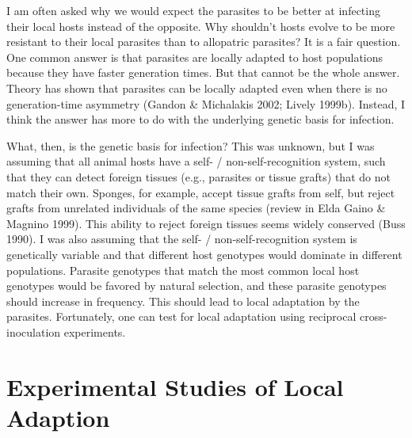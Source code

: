 \documentclass[
  letterpaper,
]{book}
\begin{document}
I am often asked why we would expect the parasites to be better at
infecting their local hosts instead of the opposite. Why shouldn't hosts
evolve to be more resistant to their local parasites than to allopatric
parasites? It is a fair question. One common answer is that parasites
are locally adapted to host populations because they have faster
generation times. But that cannot be the whole answer. Theory has shown
that parasites can be locally adapted even when there is no
generation-time asymmetry (Gandon \& Michalakis 2002; Lively 1999b).
Instead, I think the answer has more to do with the underlying genetic
basis for infection.

What, then, is the genetic basis for infection? This was unknown, but I
was assuming that all animal hosts have a self- / non-self-recognition
system, such that they can detect foreign tissues (e.g., parasites or
tissue grafts) that do not match their own. Sponges, for example, accept
tissue grafts from self, but reject grafts from unrelated individuals of
the same species (review in Elda Gaino \& Magnino 1999). This ability to
reject foreign tissues seems widely conserved (Buss 1990). I was also
assuming that the self- / non-self-recognition system is genetically
variable and that different host genotypes would dominate in different
populations. Parasite genotypes that match the most common local host
genotypes would be favored by natural selection, and these parasite
genotypes should increase in frequency. This should lead to local
adaptation by the parasites. Fortunately, one can test for local
adaptation using reciprocal cross-inoculation experiments.

\section{Experimental Studies of Local
Adaption}\label{experimental-studies-of-local-adaption}
\end{document}
